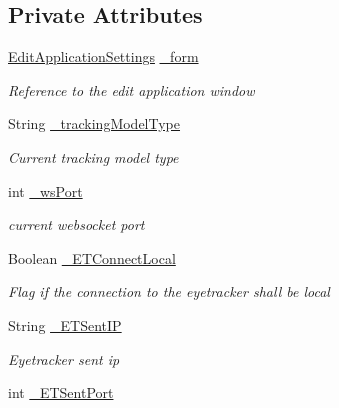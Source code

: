 \subsection*{Private Attributes}
\begin{DoxyCompactItemize}
\item 
\hyperlink{class_web_analyzer_1_1_u_i_1_1_edit_application_settings}{Edit\+Application\+Settings} \hyperlink{class_web_analyzer_1_1_u_i_1_1_interaction_objects_1_1_application_settings_obj_a6b08a377c6dc1e9f0e32d0c786012756}{\+\_\+form}
\begin{DoxyCompactList}\small\item\em Reference to the edit application window \end{DoxyCompactList}\item 
String \hyperlink{class_web_analyzer_1_1_u_i_1_1_interaction_objects_1_1_application_settings_obj_a46f28947ac5d858f82d174097a42f7ac}{\+\_\+tracking\+Model\+Type}
\begin{DoxyCompactList}\small\item\em Current tracking model type \end{DoxyCompactList}\item 
int \hyperlink{class_web_analyzer_1_1_u_i_1_1_interaction_objects_1_1_application_settings_obj_aa8f8de8781d5d9fb22fa8b1d35ccf731}{\+\_\+ws\+Port}
\begin{DoxyCompactList}\small\item\em current websocket port \end{DoxyCompactList}\item 
Boolean \hyperlink{class_web_analyzer_1_1_u_i_1_1_interaction_objects_1_1_application_settings_obj_aa7925653fa500c2ca2eeba8196660b30}{\+\_\+\+E\+T\+Connect\+Local}
\begin{DoxyCompactList}\small\item\em Flag if the connection to the eyetracker shall be local \end{DoxyCompactList}\item 
String \hyperlink{class_web_analyzer_1_1_u_i_1_1_interaction_objects_1_1_application_settings_obj_a523492d96f79d39503cb98640c567169}{\+\_\+\+E\+T\+Sent\+I\+P}
\begin{DoxyCompactList}\small\item\em Eyetracker sent ip \end{DoxyCompactList}\item 
int \hyperlink{class_web_analyzer_1_1_u_i_1_1_interaction_objects_1_1_application_settings_obj_a8101f556b9e66c46b27ade6cb57bdddd}{\+\_\+\+E\+T\+Sent\+Port}

\end{DoxyCompactItemize}
